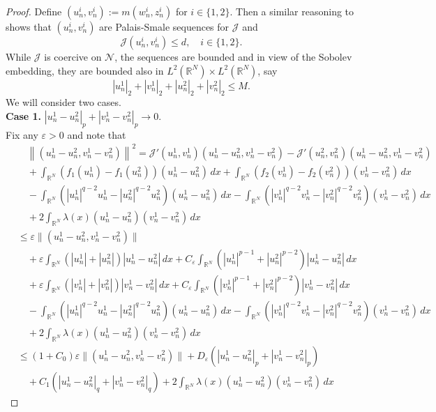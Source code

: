 \documentclass{scrartcl}
\newcommand{\cJ}{{\mathcal J}}
\newcommand{\cN}{{\mathcal N}}
\newcommand{\R}{\mathbb{R}}
\numberwithin{equation}{section}
\begin{document}
\begin{proof}
Define $(u_n^i, v_n^i) := m ( w_n^i, z_n^i )$ for $i \in \{1,2\}$. Then a similar reasoning to \cite[Corollary 2.10]{SzulkinWeth} shows that $(u_n^i, v_n^i)$ are Palais-Smale sequences for $\cJ$ and 
$$
\cJ (u_n^i, v_n^i) \leq d, \quad i \in \{1,2\}.
$$
While $\cJ$ is coercive on $\cN$, the sequences are bounded and in view of the Sobolev embedding, they are bounded also in $L^2 (\R^N) \times L^2 (\R^N)$, say 
$$
|u_n^1|_2 + |v_n^1|_2 + |u_n^2|_2 + |v_n^2|_2 \leq M.
$$
We will consider two cases. \\
\textbf{Case 1.} $|u_n^1 - u_n^2|_p + |v_n^1 - v_n^2|_p \to 0$. \\
Fix any $\varepsilon > 0$ and note that
\begin{align*}
&\quad \left\| (u_n^1 - u_n^2, v_n^1 - v_n^2) \right\|^2 = \cJ'(u_n^1, v_n^1) (u_n^1-u_n^2, v_n^1-v_n^2) - \cJ'(u_n^2, v_n^2) (u_n^1-u_n^2, v_n^1-v_n^2) \\
&\quad + \int_{\R^N} (f_1 (u_n^1) - f_1 (u_n^2) ) (u_n^1 - u_n^2) \, dx + \int_{\R^N} (f_2 (v_n^1) - f_2 (v_n^2) ) (v_n^1 - v_n^2) \, dx \\
&\quad - \int_{\R^N} \left( |u_n^1 |^{q-2} u_n^1 - |u_n^2|^{q-2} u_n^2 \right) (u_n^1 - u_n^2) \, dx - \int_{\R^N} \left( |v_n^1 |^{q-2} v_n^1 - |v_n^2|^{q-2} v_n^2 \right) (v_n^1 - v_n^2) \, dx \\
&\quad + 2 \int_{\R^N} \lambda(x) (u_n^1 - u_n^2)(v_n^1 - v_n^2) \, dx \\
&\leq \varepsilon \| (u_n^1 - u_n^2, v_n^1 - v_n^2) \| \\
&\quad + \varepsilon \int_{\R^N} (|u_n^1| + |u_n^2|) |u_n^1 - u_n^2| \, dx + C_\varepsilon \int_{\R^N} (|u_n^1|^{p-1} + |u_n^2|^{p-2}) |u_n^1 - u_n^2| \, dx \\
&\quad + \varepsilon \int_{\R^N} (|v_n^1| + |v_n^2|) |v_n^1 - v_n^2| \, dx + C_\varepsilon \int_{\R^N} (|v_n^1|^{p-1} + |v_n^2|^{p-2}) |v_n^1 - v_n^2| \, dx \\
&\quad - \int_{\R^N} \left( |u_n^1 |^{q-2} u_n^1 - |u_n^2|^{q-2} u_n^2 \right) (u_n^1 - u_n^2) \, dx - \int_{\R^N} \left( |v_n^1 |^{q-2} v_n^1 - |v_n^2|^{q-2} v_n^2 \right) (v_n^1 - v_n^2) \, dx \\
&\quad + 2 \int_{\R^N} \lambda(x) (u_n^1 - u_n^2)(v_n^1 - v_n^2) \, dx \\
&\leq (1 + C_0) \varepsilon \| (u_n^1 - u_n^2, v_n^1 - v_n^2) \| + D_\varepsilon \left( |u_n^1 - u_n^2|_p + |v_n^1 - v_n^2|_p \right) \\
&\quad + C_1 \left( |u_n^1 - u_n^2|_q + |v_n^1 - v_n^2|_q \right) + 2 \int_{\R^N} \lambda(x) (u_n^1 - u_n^2)(v_n^1 - v_n^2) \, dx

\end{align*}
\end{proof}
\end{document}
